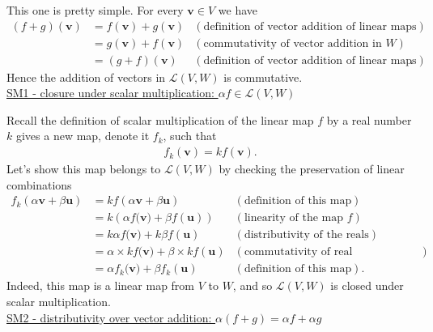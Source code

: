 \noindent This one is pretty simple. For every $\mathbf{v}\in V$ we have
\begin{align*}
(f + g)(\mathbf{v}) &= f(\mathbf{v}) + g(\mathbf{v})  &  (\text{definition of vector addition of linear maps}) \\
%
&= g(\mathbf{v}) + f(\mathbf{v})  &  (\text{commutativity of vector addition in $W$}) \\
%
&= (g+ f)(\mathbf{v})  &  (\text{definition of vector addition of linear maps}).
\end{align*}
Hence the addition of vectors in $\mathcal{L}(V,W)$ is commutative. \\


\noindent \underline{SM1 - closure under scalar multiplication: $\alpha f \in \mathcal{L}(V,W)$}

\noindent Recall the definition of scalar multiplication of the linear map $f$ by a real number $k$ gives a new map, denote it $f_k$, such that
\begin{align*}
f_k(\mathbf{v}) = k f(\mathbf{v}).
\end{align*}
Let's show this map belongs to $\mathcal{L}(V,W)$ by checking the preservation of linear combinations
\begin{align*}
f_k(\alpha \mathbf{v} + \beta \mathbf{u}) &= k f(\alpha \mathbf{v} + \beta \mathbf{u})  &  (\text{definition of this map}) \\
%
 &= k \left( \alpha f(\mathbf{v)} + \beta f(\mathbf{u}) \right)  &  (\text{linearity of the map $f$}) \\
%
 &= k \alpha f(\mathbf{v)} +k \beta f(\mathbf{u})  &  (\text{distributivity of the reals}) \\
%
 &= \alpha \times kf(\mathbf{v)} + \beta \times kf(\mathbf{u})  &  (\text{commutativity of real multiplication}) \\
%
 &= \alpha f_k(\mathbf{v)} + \beta f_k(\mathbf{u})  &  (\text{definition of this map}).
\end{align*}
Indeed, this map is a linear map from $V$ to $W$, and so $\mathcal{L}(V,W)$ is closed under scalar multiplication. \\


\noindent \underline{SM2 - distributivity over vector addition: $\alpha(f+g)=\alpha f+\alpha g$}

